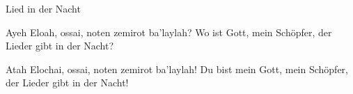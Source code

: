 Lied in der Nacht

Ayeh Eloah, ossai, noten zemirot ba'laylah?       Wo ist Gott, mein Schöpfer, der Lieder gibt in der Nacht?

Atah Elochai, ossai, noten zemirot ba'laylah!     Du bist mein Gott, mein Schöpfer, der Lieder gibt in der Nacht!